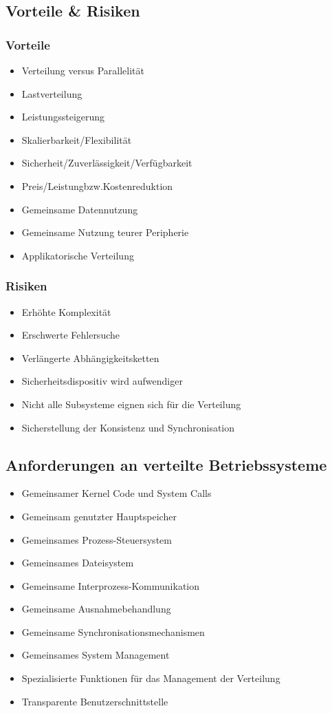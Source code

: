 \documentclass[a4paper, 10pt]{article}
\begin{document}
\subsection{Vorteile \& Risiken}

\subsubsection{Vorteile}
\begin{itemize}
	\item Verteilung versus Parallelit\"at
	\item Lastverteilung
	\item Leistungssteigerung
	\item Skalierbarkeit/Flexibilit\"at
	\item Sicherheit/Zuverl\"assigkeit/Verf\"ugbarkeit
	\item Preis/Leistungbzw.Kostenreduktion
	\item Gemeinsame Datennutzung
	\item Gemeinsame Nutzung teurer Peripherie
	\item Applikatorische Verteilung
\end{itemize}

\subsubsection{Risiken}
\begin{itemize}
	\item Erhöhte Komplexit\"at
	\item Erschwerte Fehlersuche	
	\item Verl\"angerte Abh\"angigkeitsketten
	\item Sicherheitsdispositiv wird aufwendiger
	\item Nicht alle Subsysteme eignen sich f\"ur die Verteilung
	\item Sicherstellung der Konsistenz und Synchronisation
\end{itemize}

\subsection{Anforderungen an verteilte Betriebssysteme}
\begin{itemize}
	\item Gemeinsamer Kernel Code und System Calls
	\item Gemeinsam genutzter Hauptspeicher
	\item Gemeinsames Prozess-Steuersystem
	\item Gemeinsames Dateisystem
	\item Gemeinsame Interprozess-Kommunikation
	\item Gemeinsame Ausnahmebehandlung
	\item Gemeinsame Synchronisationsmechanismen
	\item Gemeinsames System Management
	\item Spezialisierte Funktionen f\"ur das Management der Verteilung
	\item Transparente Benutzerschnittstelle
\end{itemize}
\end{document}

